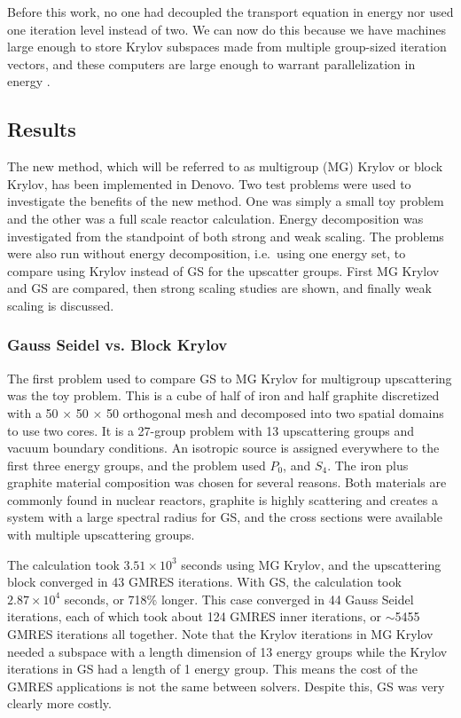 Before this work, no one had decoupled the transport equation in energy nor used one iteration level instead of two. We can now do this because we have machines large enough to store Krylov subspaces made from multiple group-sized iteration vectors, and these computers are large enough to warrant parallelization in energy . 

\subsection{Results}
The new method, which will be referred to as multigroup (MG) Krylov or block Krylov, has been implemented in Denovo. Two test problems were used to investigate the benefits of the new method. One was simply a small toy problem and the other was a full scale reactor calculation. Energy decomposition was investigated from the standpoint of both strong and weak scaling. The problems were also run without energy decomposition, i.e.\ using one energy set, to compare using Krylov instead of GS for the upscatter groups. First MG Krylov and GS are compared, then strong scaling studies are shown, and finally weak scaling is discussed.

\subsubsection{Gauss Seidel vs. Block Krylov}
The first problem used to compare GS to MG Krylov for multigroup upscattering was the toy problem. This is a cube of half of iron and half graphite discretized with a 50 $\times$ 50 $\times$ 50 orthogonal mesh and decomposed into two spatial domains to use two cores. It is a 27-group problem with 13 upscattering groups and vacuum boundary conditions. An isotropic source is assigned everywhere to the first three energy groups, and the problem used $P_0$, and $S_4$. The iron plus graphite material composition was chosen for several reasons. Both materials are commonly found in nuclear reactors, graphite is highly scattering and creates a system with a large spectral radius for GS, and the cross sections were available with multiple upscattering groups.

The calculation took $3.51 \times 10^{3}$ seconds using MG Krylov, and the upscattering block converged in 43 GMRES iterations. With GS, the calculation took $2.87 \times 10^{4}$ seconds, or 718\% longer. This case converged in 44 Gauss Seidel iterations, each of which took about 124 GMRES inner iterations, or $\sim$5455 GMRES iterations all together. Note that the Krylov iterations in MG Krylov needed a subspace with a length dimension of 13 energy groups while the Krylov iterations in GS had a length of 1 energy group. This means the cost of the GMRES applications is not the same between solvers. Despite this, GS was very clearly more costly.

